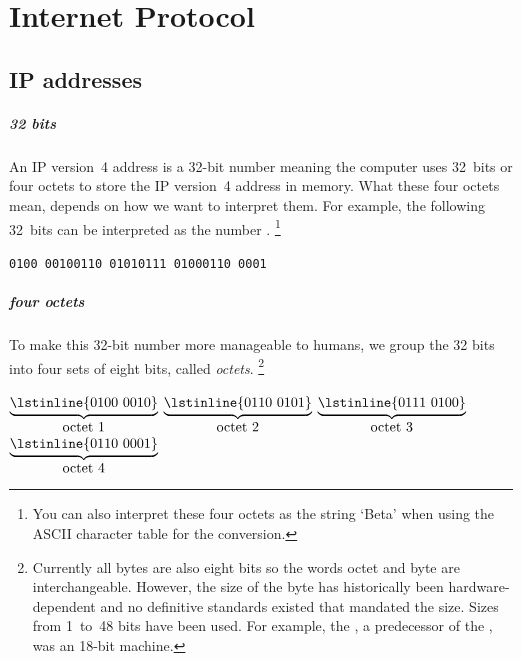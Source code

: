 \chapter{Internet Protocol}
\label{chap:ip}

\section{\acs{IP} addresses}
\label{sec:ip-addresses}
   
\paragraph{32 bits}
An \acs{IP} version~4 address is a 32-bit number meaning the computer uses 32~bits or four octets to store the \acs{IP} version~4 address in memory.
What these four octets mean, depends on how we want to interpret them.
For example, the following 32~bits can be interpreted as the number .%
   \footnote{You can also interpret these four octets as the string `Beta' when using the \acs{ASCII} character table for the conversion.}
\begin{center}
\lstinline{0100 0010}\quad\lstinline{0110 0101}\quad\lstinline{0111 0100}\quad\lstinline{0110 0001}
\end{center}     

\paragraph{four octets}
To make this 32-bit number more manageable to humans, we group the 32 bits into four sets of eight bits, called \emph{octets}.%
\footnote{%
   Currently all bytes are also eight bits so the words octet and byte are interchangeable.
   However, the size of the byte has historically been hardware-dependent and no definitive standards existed that mandated the size.
   Sizes from 1~to~48 bits have been used.
   For example, the , a predecessor of the , was an 18-bit machine.
}
\begin{center}
$\underbrace{\mbox{\lstinline{0100 0010}}}_{\mbox{octet 1}}$\quad%
$\underbrace{\mbox{\lstinline{0110 0101}}}_{\mbox{octet 2}}$\quad%
$\underbrace{\mbox{\lstinline{0111 0100}}}_{\mbox{octet 3}}$\quad%
$\underbrace{\mbox{\lstinline{0110 0001}}}_{\mbox{octet 4}}$
\end{center} 

